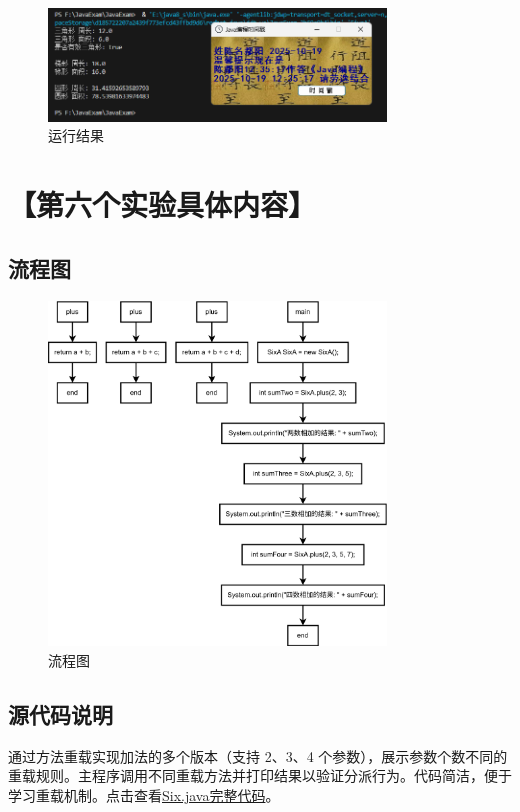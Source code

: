 \documentclass[12pt,a4paper]{article}
\begin{document}
\begin{figure}[H]
\centering
\includegraphics[width=0.8\textwidth,height=0.8\textheight,keepaspectratio]{fivea.png}
\caption{运行结果}
\end{figure}

\section*{【第六个实验具体内容】}
\subsection*{流程图}

\begin{figure}[H]
\centering
\includegraphics[width=0.8\textwidth,height=0.8\textheight,keepaspectratio]{sixa1.png}
\caption{流程图}
\end{figure}

\subsection*{源代码说明}
通过方法重载实现加法的多个版本（支持 2、3、4 个参数），展示参数个数不同的重载规则。主程序调用不同重载方法并打印结果以验证分派行为。代码简洁，便于学习重载机制。点击查看\hyperref[sec:six]{Six.java完整代码}。
\end{document}
